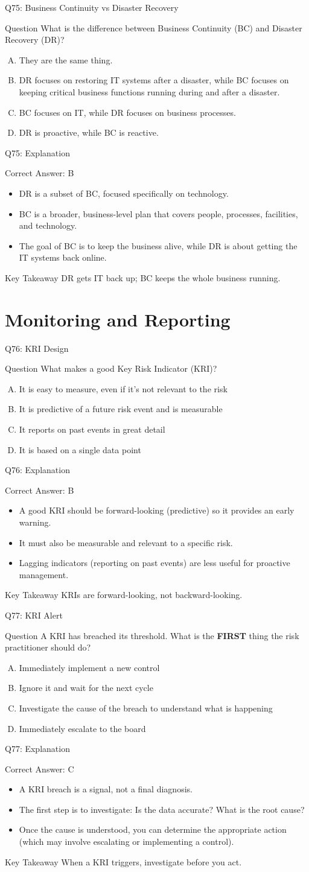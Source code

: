 \documentclass[aspectratio=169]{beamer}
\newcommand{\hq}[7]{%
	\begin{frame}{Q#1: #2}
		\begin{block}{Question}
			#3
		\end{block}
		\begin{enumerate}[(A)]
			#4
		\end{enumerate}
	\end{frame}
	\begin{frame}{Q#1: Explanation}
		\begin{block}{Correct Answer: #5}
			\begin{itemize}
				#6
			\end{itemize}
		\end{block}
		\begin{alertblock}{Key Takeaway}
			#7
		\end{alertblock}
	\end{frame}
}
\begin{document}
	\hq{75}{Business Continuity vs Disaster Recovery}
	{What is the difference between Business Continuity (BC) and Disaster Recovery (DR)?}
	{\item They are the same thing.
		\item DR focuses on restoring IT systems after a disaster, while BC focuses on keeping critical business functions running during and after a disaster.
		\item BC focuses on IT, while DR focuses on business processes.
		\item DR is proactive, while BC is reactive.}
	{B}
	{\item DR is a subset of BC, focused specifically on technology.
		\item BC is a broader, business-level plan that covers people, processes, facilities, and technology.
		\item The goal of BC is to keep the business alive, while DR is about getting the IT systems back online.}
	{DR gets IT back up; BC keeps the whole business running.}
	
	\section{Monitoring and Reporting}
	
	\hq{76}{KRI Design}
	{What makes a good Key Risk Indicator (KRI)?}
	{\item It is easy to measure, even if it's not relevant to the risk
		\item It is predictive of a future risk event and is measurable
		\item It reports on past events in great detail
		\item It is based on a single data point}
	{B}
	{\item A good KRI should be forward-looking (predictive) so it provides an early warning.
		\item It must also be measurable and relevant to a specific risk.
		\item Lagging indicators (reporting on past events) are less useful for proactive management.}
	{KRIs are forward-looking, not backward-looking.}
	
	\hq{77}{KRI Alert}
	{A KRI has breached its threshold. What is the \textbf{FIRST} thing the risk practitioner should do?}
	{\item Immediately implement a new control
		\item Ignore it and wait for the next cycle
		\item Investigate the cause of the breach to understand what is happening
		\item Immediately escalate to the board}
	{C}
	{\item A KRI breach is a signal, not a final diagnosis.
		\item The first step is to investigate: Is the data accurate? What is the root cause?
		\item Once the cause is understood, you can determine the appropriate action (which may involve escalating or implementing a control).}
	{When a KRI triggers, investigate before you act.}
	
\end{document}
